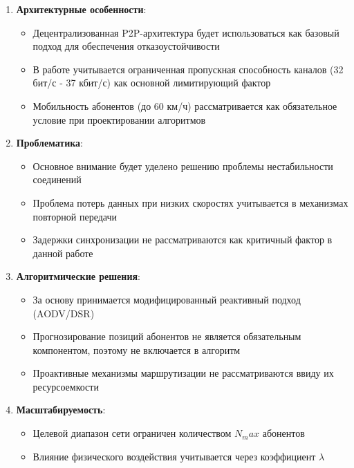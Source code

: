 \begin{enumerate}
    \item \textbf{Архитектурные особенности}:
    \begin{itemize}
        \item Децентрализованная P2P-архитектура будет использоваться как базовый подход для обеспечения отказоустойчивости
        \item В работе учитывается ограниченная пропускная способность каналов (32 бит/с - 37 кбит/с) как основной лимитирующий фактор
        \item Мобильность абонентов (до 60 км/ч) рассматривается как обязательное условие при проектировании алгоритмов
    \end{itemize}
    
    \item \textbf{Проблематика}:
    \begin{itemize}
        \item Основное внимание будет уделено решению проблемы нестабильности соединений
        \item Проблема потерь данных при низких скоростях учитывается в механизмах повторной передачи
        \item Задержки синхронизации не рассматриваются как критичный фактор в данной работе
    \end{itemize}
    
    \item \textbf{Алгоритмические решения}:
    \begin{itemize}
        \item За основу принимается модифицированный реактивный подход (AODV/DSR)
        \item Прогнозирование позиций абонентов не является обязательным компонентом, поэтому не включается в алгоритм
        \item Проактивные механизмы маршрутизации не рассматриваются ввиду их ресурсоемкости
    \end{itemize}
    
    \item \textbf{Масштабируемость}:
    \begin{itemize}
        \item Целевой диапазон сети ограничен количеством $N_max$ абонентов
        \item Влияние физического воздействия учитывается через коэффициент $\lambda$
    \end{itemize}
\end{enumerate}